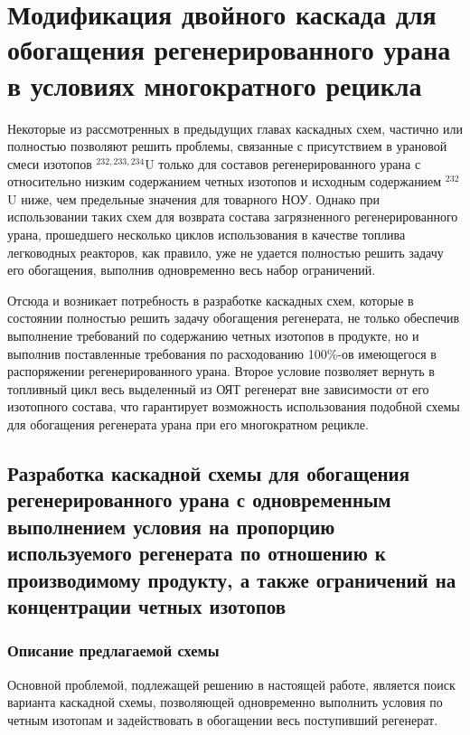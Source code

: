 \chapter{Модификация двойного каскада для обогащения регенерированного урана в условиях многократного рецикла}\label{ch:ch3}

Некоторые из рассмотренных в предыдущих главах каскадных схем, частично или полностью позволяют решить проблемы, связанные с присутствием в урановой смеси изотопов $^{232,233,234}$U только для составов регенерированного урана с относительно низким содержанием четных изотопов и исходным содержанием $^{232}$U ниже, чем предельные значения для товарного НОУ. Однако при использовании таких схем для возврата состава загрязненного регенерированного урана, прошедшего несколько циклов использования в качестве топлива легководных реакторов, как правило, уже не удается полностью решить задачу его обогащения, выполнив одновременно весь набор ограничений.

Отсюда и возникает потребность в разработке каскадных схем, которые в состоянии полностью решить задачу обогащения регенерата, не только обеспечив выполнение требований по содержанию четных изотопов в продукте, но и выполнив поставленные требования по расходованию 100\%-ов имеющегося в распоряжении регенерированного урана. Второе условие позволяет вернуть в топливный цикл весь выделенный из ОЯТ регенерат вне зависимости от его изотопного состава, что гарантирует возможность использования подобной схемы для обогащения регенерата урана при его многократном рецикле.

\section{Разработка каскадной схемы для обогащения регенерированного урана с одновременным выполнением условия на пропорцию используемого регенерата по отношению к производимому продукту, а также ограничений на концентрации четных изотопов}
\subsection{Описание предлагаемой схемы}\label{triple_descr}

Основной проблемой, подлежащей решению в настоящей работе, является поиск варианта каскадной схемы, позволяющей одновременно выполнить условия по четным изотопам и задействовать в обогащении весь поступивший регенерат.

